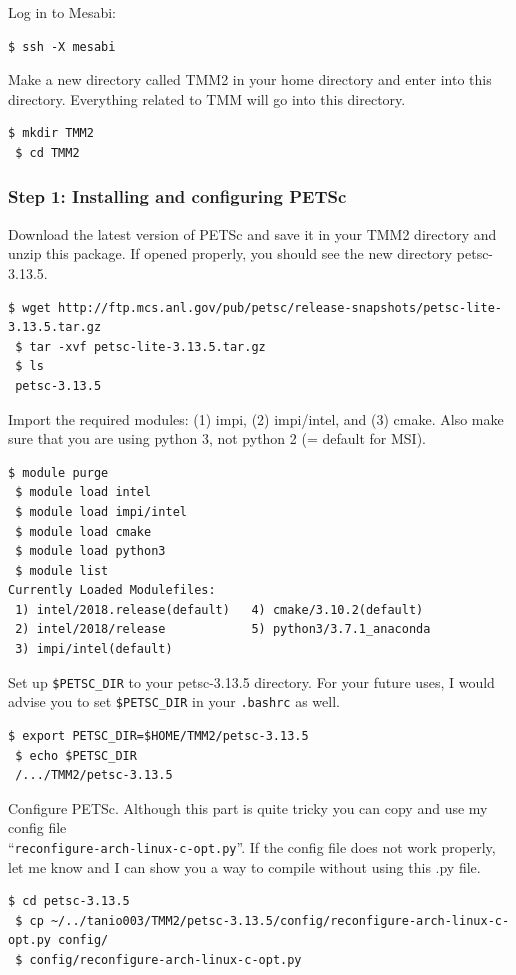 \documentclass[a4paper]{article}
\def\noin{\noindent }
\begin{document}
\noin Log in to Mesabi: 
\begin{lstlisting}[style=DOS]
 $ ssh -X mesabi
\end{lstlisting}

\noin Make a new directory called TMM2 in your home directory and enter into this directory. Everything related to TMM will go into this directory.
\begin{lstlisting}[style=DOS]
 $ mkdir TMM2
 $ cd TMM2
\end{lstlisting}

\subsubsection{Step 1: Installing and configuring PETSc}

\noin Download the latest version of PETSc and save it in your TMM2 directory and unzip this package. If opened properly, you should see the new directory petsc-3.13.5. 
\begin{lstlisting}[style=DOS]
 $ wget http://ftp.mcs.anl.gov/pub/petsc/release-snapshots/petsc-lite-3.13.5.tar.gz
 $ tar -xvf petsc-lite-3.13.5.tar.gz
 $ ls
 petsc-3.13.5
\end{lstlisting}

\noin Import the required modules: (1) impi, (2) impi/intel, and (3) cmake. Also make sure that you are using python 3, not python 2 (= default for MSI). 
\begin{lstlisting}[style=DOS]
 $ module purge 
 $ module load intel
 $ module load impi/intel
 $ module load cmake
 $ module load python3
 $ module list
Currently Loaded Modulefiles:
 1) intel/2018.release(default)   4) cmake/3.10.2(default)
 2) intel/2018/release            5) python3/3.7.1_anaconda
 3) impi/intel(default)
\end{lstlisting}

\noin Set up \verb/$PETSC_DIR/ to your petsc-3.13.5 directory. For your future uses, I would advise you to set \verb|$PETSC_DIR| in your \verb|.bashrc| as well. 
\begin{lstlisting}[style=DOS]
 $ export PETSC_DIR=$HOME/TMM2/petsc-3.13.5
 $ echo $PETSC_DIR 
 /.../TMM2/petsc-3.13.5
\end{lstlisting}

\noin Configure PETSc. Although this part is quite tricky you can copy and use my config file \\ ``\verb/reconfigure-arch-linux-c-opt.py/''. If the config file does not work properly, let me know and I can show you a way to compile without using this .py file. 
\begin{lstlisting}[style=DOS]
 $ cd petsc-3.13.5
 $ cp ~/../tanio003/TMM2/petsc-3.13.5/config/reconfigure-arch-linux-c-opt.py config/
 $ config/reconfigure-arch-linux-c-opt.py
\end{lstlisting}
\end{document}

